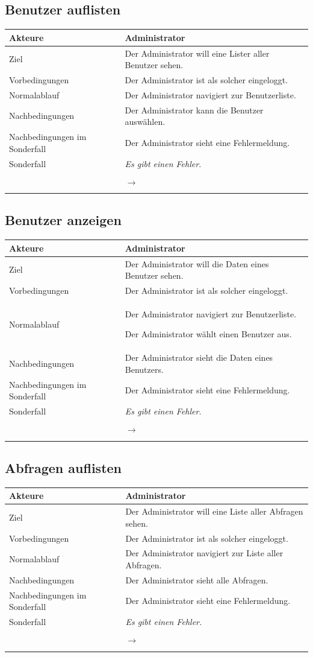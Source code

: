 \documentclass[a4paper,10pt,titlepage]{article}
\makeatletter
\newcommand\novspace{\@minipagetrue}
\newenvironment{owncompactitem}{%
\compactitem
}{%
\@finalstrut\@arstrutbox
\@nameuse{endcompactitem}%
\aftergroup\let\aftergroup\@finalstrut\aftergroup\@gobble
}
\newenvironment{owncompactenum}{%
\compactenum
}{%
\@finalstrut\@arstrutbox
\@nameuse{endcompactenum}%
\aftergroup\let\aftergroup\@finalstrut\aftergroup\@gobble
}
\newcommand{\usecase}[7]
{\subsection{#1}
\setlength{\extrarowheight}{2pt}
\begin{tabular}{|p{0.2\textwidth}|p{0.9\textwidth}|}
\hline
  Akteure & #2\\\hline
  Ziel & #3\\\hline
  Vorbedingungen & \novspace
  	\begin{owncompactitem}[-] #4 \end{owncompactitem} \\\hline
  Normalablauf & \vspace{-7pt}
  	\begin{owncompactenum}[1.] #6 \end{owncompactenum} \\\hline
  Nachbedingungen & \novspace
  	\begin{owncompactitem}[-] #5 \end{owncompactitem} \\\hline
  #7
\end{tabular}
}
\newcommand{\kurzersonderfall}[3][\empty]
{
Sonderfall #2 & \vspace{-10pt}
	\textit{#3}
  	\ifthenelse{\equal{#1}{\empty}}
    	{\\\hline} %
    	{\\&\ensuremath{\rightarrow} #1 \\ [+1pt] \hline} %

}
\newcommand{\sondernachbedingung}[1]
{
Nachbedingungen im Sonderfall& \novspace
	\begin{owncompactitem}[-]
		#1
	\end{owncompactitem} \\\hline
}
\makeatother
\begin{document}
\usecase{Benutzer auflisten}{Administrator}%
{%
Der Administrator will eine Lister aller Benutzer sehen.
}{%
	\item Der Administrator ist als solcher eingeloggt.
}{%
	\item Der Administrator kann die Benutzer auswählen.
}{%
	\item Der Administrator navigiert zur Benutzerliste.
}{%
\sondernachbedingung{
	\item Der Administrator sieht eine Fehlermeldung.
	}
\kurzersonderfall[]{}%
	{%
	Es gibt einen Fehler.
	}
}

\usecase{Benutzer anzeigen}{Administrator}%
{%
Der Administrator will die Daten eines Benutzer sehen.
}{%
	\item Der Administrator ist als solcher eingeloggt.
}{%
	\item Der Administrator sieht die Daten eines Benutzers.
}{%
	\item Der Administrator navigiert zur Benutzerliste.
	\item Der Administrator wählt einen Benutzer aus.
}{%
\sondernachbedingung{
	\item Der Administrator sieht eine Fehlermeldung.
	}
\kurzersonderfall[]{}%
	{%
	Es gibt einen Fehler.
	}
}

\usecase{Abfragen auflisten}{Administrator}%
{%
Der Administrator will eine Liste aller Abfragen sehen.
}{%
	\item Der Administrator ist als solcher eingeloggt.
}{%
	\item Der Administrator sieht alle Abfragen.
}{%
	\item Der Administrator navigiert zur Liste aller Abfragen.
}{%
\sondernachbedingung{
	\item Der Administrator sieht eine Fehlermeldung.
	}
\kurzersonderfall[]{}%
	{%
	Es gibt einen Fehler.
	}
}
\end{document}
